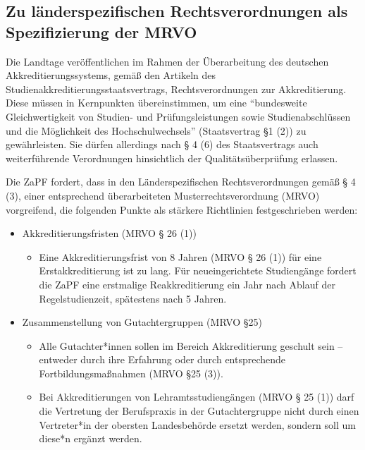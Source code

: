 
\subsection{Zu länderspezifischen Rechtsverordnungen als Spezifizierung der MRVO}
Die Landtage veröffentlichen im Rahmen der Überarbeitung des deutschen Akkreditierungssystems, gemäß den Artikeln des Studienakkreditierungsstaatsvertrags, Rechtsverordnungen zur Akkreditierung.\\
Diese müssen in Kernpunkten übereinstimmen, um eine "`bundesweite Gleichwertigkeit von Studien- und Prüfungsleistungen sowie Studienabschlüssen und die Möglichkeit des Hochschulwechsels"' (Staatsvertrag §1 (2)) zu gewährleisten. Sie dürfen allerdings nach § 4 (6) des Staatsvertrags auch weiterführende Verordnungen hinsichtlich der Qualitätsüberprüfung erlassen.

Die ZaPF fordert, dass in den Länderspezifischen Rechtsverordnungen gemäß § 4 (3), einer entsprechend überarbeiteten Musterrechtsverordnung (MRVO) vorgreifend, die folgenden Punkte als stärkere Richtlinien festgeschrieben werden:

\begin{itemize}
\item Akkreditierungsfristen (MRVO § 26 (1))
	\begin{itemize}
    \item Eine Akkreditierungsfrist von 8 Jahren (MRVO § 26 (1)) für eine Erstakkreditierung ist zu lang. Für neueingerichtete Studiengänge fordert die ZaPF eine erstmalige Reakkreditierung ein Jahr nach Ablauf der Regelstudienzeit, spätestens nach 5 Jahren.
    \end{itemize}
\item Zusammenstellung von Gutachtergruppen (MRVO §25)
	\begin{itemize}
    \item Alle Gutachter*innen sollen im Bereich Akkreditierung geschult sein -- entweder durch ihre Erfahrung oder durch entsprechende Fortbildungsmaßnahmen (MRVO §25 (3)).
    \item Bei Akkreditierungen von Lehramtsstudiengängen (MRVO § 25 (1)) darf die Vertretung der Berufspraxis in der Gutachtergruppe nicht durch einen Vertreter*in der obersten Landesbehörde ersetzt werden, sondern soll um diese*n ergänzt werden.
    \end{itemize}
\end{itemize}
